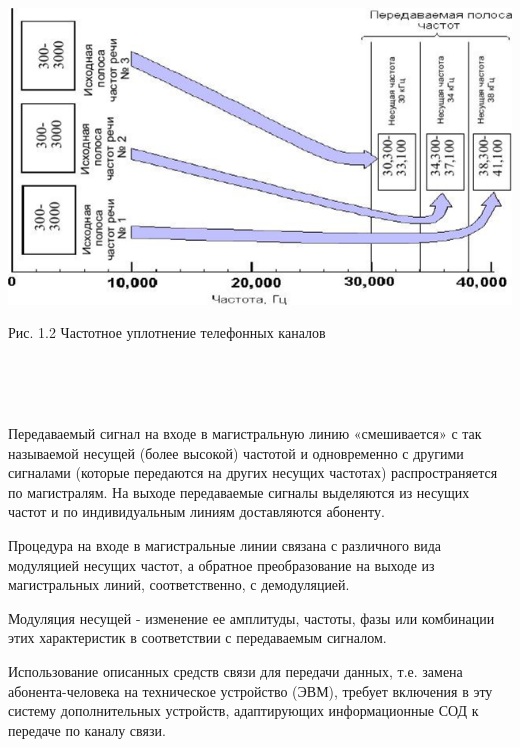 \documentclass[a4paper]{report}
\begin{document}
\bigskip
\includegraphics[scale=1.4]{67}
{\centering\caption{\newline Рис. 1.2 Частотное уплотнение телефонных каналов}\\}
~

Передаваемый сигнал на входе в магистральную линию «смешивается» с так называемой несущей (более высокой) частотой и одновременно с другими сигналами (которые передаются на других несущих частотах) распространяется по магистралям. На выходе передаваемые сигналы выделяются из несущих частот и по индивидуальным линиям доставляются абоненту.

Процедура на входе в магистральные линии связана с различного вида модуляцией несущих частот, а обратное преобразование на выходе из магистральных линий, соответственно, с демодуляцией.

Модуляция несущей - изменение ее амплитуды, частоты, фазы или комбинации этих характеристик в соответствии с передаваемым сигналом.

Использование описанных средств связи для передачи данных, т.е. замена абонента-человека на техническое устройство (ЭВМ), требует включения в эту систему дополнительных устройств, адаптирующих информационные СОД к передаче по каналу связи.
\end{document}

